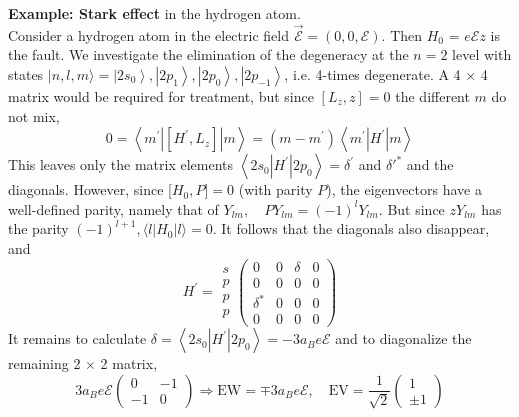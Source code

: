 \textbf{Example: Stark effect} in the hydrogen atom.\\
Consider a hydrogen atom in the electric field $\vec{\mathcal{E}} = (0, 0, \mathcal{E})$. Then $H_0$ = $e\mathcal{E}z$ is the fault. We investigate the elimination of the degeneracy at the $n = 2$ level with states $|n, l, m\rangle=\left|2 s_{0}\right\rangle,\left|2 p_{1}\right\rangle,\left|2 p_{0}\right\rangle,\left|2 p_{-1}\right\rangle$, i.e. 4-times degenerate. A 4 $\times$ 4 matrix would be required for treatment, but since $[L_z, z] = 0$ the different $m$ do not mix,
\begin{equation}
    0=\left\langle m^{\prime}\left|\left[H^{\prime}, L_{z}\right]\right| m\right\rangle=\left(m-m^{\prime}\right)\left\langle m^{\prime}\left|H^{\prime}\right| m\right\rangle
    \end{equation}
This leaves only the matrix elements $\left\langle 2 s_{0}\left|H^{\prime}\right| 2 p_{0}\right\rangle=\delta^{\prime}$ and $\delta'^*$ and the diagonals. However, since [$H_0, P] = 0$ (with parity $P$), the eigenvectors have a well-defined parity, namely that of $Y_{l m}, \quad P Y_{l m}=(-1)^lY_{l m}$. But since $z Y_{lm}$ has the parity $(−1)^{l + 1}, \langle l | H_0 | l\rangle = 0$. It follows that the diagonals also disappear, and
\begin{equation}
H^{\prime}=\begin{array}{c}{s} \\ {p} \\ {p} \\ {p}\end{array}\left(\begin{array}{cccc}{0} & {0} & {\delta} & {0} \\ {0} & {0} & {0} & {0} \\ {\delta^{*}} & {0} & {0} & {0} \\ {0} & {0} & {0} & {0}\end{array}\right)
\end{equation}
It remains to calculate $\delta=\left\langle 2 s_{0}\left|H^{\prime}\right| 2 p_{0}\right\rangle=- 3 a_{B} e \mathcal{E}$ and to diagonalize the remaining 2 $\times$ 2 matrix,
\begin{equation}
3 a_{B} e \mathcal{E}\left(\begin{array}{cc}{0} & {-1} \\ {-1} & {0}\end{array}\right) \Rightarrow \mathrm{EW}=\mp 3 a_{B} e \mathcal{E}, \quad \mathrm{EV}=\frac{1}{\sqrt{2}}\left(\begin{array}{c}{1} \\ {\pm 1}\end{array}\right)
\end{equation}
